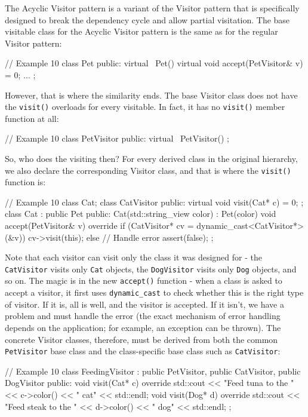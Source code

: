 The Acyclic Visitor pattern is a variant of the Visitor pattern that is specifically designed to break the dependency cycle and allow partial visitation. The base visitable class for the Acyclic Visitor pattern is the same as for the regular Visitor pattern:

\begin{code}
// Example 10
class Pet {
  public:
  virtual ~Pet() {}
  virtual void accept(PetVisitor& v) = 0;
  ...
};
\end{code}

However, that is where the similarity ends. The base Visitor class does not have the \texttt{visit()} overloads for every visitable. In fact, it has no \texttt{visit()} member function at all:

\begin{code}
// Example 10
class PetVisitor {
  public:
  virtual ~PetVisitor() {}
};
\end{code}

So, who does the visiting then? For every derived class in the original hierarchy, we also declare the corresponding Visitor class, and that is where the \texttt{visit()} function is:

\begin{code}
// Example 10
class Cat;
class CatVisitor {
  public:
  virtual void visit(Cat* c) = 0;
};
class Cat : public Pet {
  public:
  Cat(std::string_view color) : Pet(color) {}
  void accept(PetVisitor& v) override {
    if (CatVisitor* cv = dynamic_cast<CatVisitor*>(&v)) {
      cv->visit(this);
    } else { // Handle error
      assert(false);
    }
  }
};
\end{code}

Note that each visitor can visit only the class it was designed for - the \texttt{CatVisitor} visits only \texttt{Cat} objects, the \texttt{DogVisitor} visits only \texttt{Dog} objects, and so on. The magic is in the new \texttt{accept()} function - when a class is asked to accept a visitor, it first uses \texttt{dynamic\_cast} to check whether this is the right type of visitor. If it is, all is well, and the visitor is accepted. If it isn't, we have a problem and must handle the error (the exact mechanism of error handling depends on the application; for example, an exception can be thrown). The concrete Visitor classes, therefore, must be derived from both the common \texttt{PetVisitor} base class and the class-specific base class such as \texttt{CatVisitor}:

\begin{code}
// Example 10
class FeedingVisitor : public PetVisitor,
                       public CatVisitor,
                       public DogVisitor {
  public:
  void visit(Cat* c) override {
    std::cout << "Feed tuna to the " << c->color()
              << " cat" << std::endl;
  }
  void visit(Dog* d) override {
    std::cout << "Feed steak to the " << d->color()
              << " dog" << std::endl;
  }
};
\end{code}

